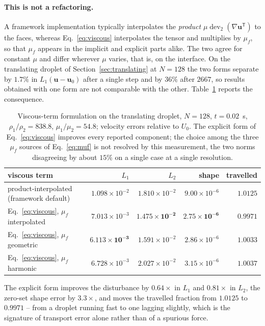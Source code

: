 \documentclass[preprint,3p,11pt]{elsarticle}
\newcommand{\uvec}{\mathbf{u}}
\begin{document}
\paragraph{This is not a refactoring.} A framework implementation typically interpolates
the \emph{product} $\mu\operatorname{dev}_2(\nabla\uvec^{\mathsf T})$ to the faces, whereas
Eq.~\eqref{eq:viscous} interpolates the tensor and multiplies by $\mu_f$, so that $\mu_f$
appears in the implicit and explicit parts alike. The two agree for constant $\mu$ and
differ wherever $\mu$ varies, that is, on the interface. On the translating droplet of
Section~\ref{sec:translating} at $N=128$ the two forms separate by $1.7\%$ in
$L_1(\uvec-\uvec_0)$ after a single step and by $36\%$ after $2667$, so results obtained
with one form are not comparable with the other. Table~\ref{tab:viscous} reports the
consequence.

\begin{table}[t]
  \centering
  \caption{Viscous-term formulation on the translating droplet, $N=128$, $t=0.02$~s,
  $\rho_1/\rho_2=838.8$, $\mu_1/\mu_2=54.8$; velocity errors relative to $U_0$. The
  explicit form of Eq.~\eqref{eq:viscous} improves every reported component; the choice
  among the three $\mu_f$ sources of Eq.~\eqref{eq:muf} is not resolved by this
  measurement, the two norms disagreeing by about $15\%$ on a single case at a single
  resolution.}
  \label{tab:viscous}
  \begin{tabular}{l r r r r}
    \hline
    viscous term & $L_1$ & $L_2$ & shape & travelled \\
    \hline
    product-interpolated (framework default) & $1.098\times10^{-2}$ & $1.810\times10^{-2}$ & $9.00\times10^{-6}$ & $1.0125$ \\
    Eq.~\eqref{eq:viscous}, $\mu_f$ interpolated & $7.013\times10^{-3}$ & $\mathbf{1.475\times10^{-2}}$ & $\mathbf{2.75\times10^{-6}}$ & $\mathbf{0.9971}$ \\
    Eq.~\eqref{eq:viscous}, $\mu_f$ geometric    & $\mathbf{6.113\times10^{-3}}$ & $1.591\times10^{-2}$ & $2.86\times10^{-6}$ & $1.0033$ \\
    Eq.~\eqref{eq:viscous}, $\mu_f$ harmonic     & $6.728\times10^{-3}$ & $2.027\times10^{-2}$ & $3.15\times10^{-6}$ & $1.0037$ \\
    \hline
  \end{tabular}
\end{table}

The explicit form improves the disturbance by $0.64\times$ in $L_1$ and $0.81\times$ in
$L_2$, the zero-set shape error by $3.3\times$, and moves the travelled fraction from
$1.0125$ to $0.9971$ -- from a droplet running fast to one lagging slightly, which is the
signature of transport error alone rather than of a spurious force.
\end{document}
